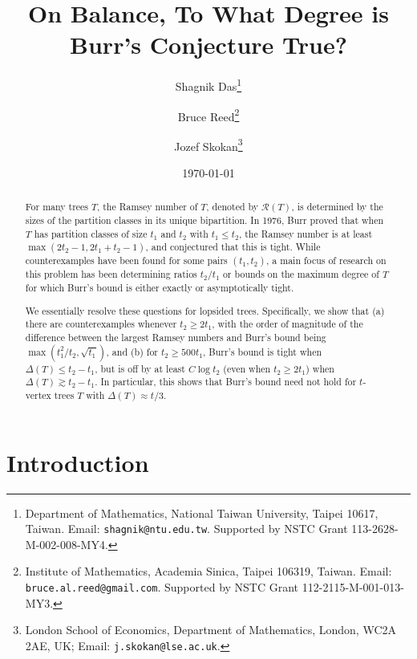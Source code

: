 \documentclass[11pt]{article}
\begin{document}
\title{On Balance, To What Degree is Burr's Conjecture True?} 
\author{Shagnik Das\footnote{Department of Mathematics, National Taiwan University, Taipei 10617, Taiwan. Email: \texttt{shagnik@ntu.edu.tw}. Supported by NSTC Grant 113-2628-M-002-008-MY4.} 
\and 
Bruce Reed\footnote{Institute of Mathematics, Academia Sinica, Taipei 106319, Taiwan. Email: \texttt{bruce.al.reed@gmail.com}. Supported by NSTC Grant 112-2115-M-001-013-MY3.} 
\and 
Jozef Skokan\footnote{London School of Economics, Department of Mathematics, London, WC2A 2AE, UK; Email: \texttt{j.skokan@lse.ac.uk}.} }
\date{\today}



\maketitle
\begin{abstract}
    For many trees $T$, the Ramsey number of $T$, denoted by ${\mathcal R}(T)$, is determined by the sizes of the partition classes in its unique bipartition. In 1976, Burr proved that when $T$ has partition classes of size $t_1$ and $t_2$ with $t_1 \le t_2$, the Ramsey number is at least $\max(2t_2-1,2t_1+t_2-1)$, and conjectured that this is tight. While counterexamples have been found for some pairs $(t_1, t_2)$, a main focus of research on this problem has been determining ratios $t_2/t_1$ or bounds on the maximum degree of $T$ for which Burr's bound is either exactly or asymptotically tight.
    
    We essentially resolve these questions for lopsided trees. Specifically, we show that (a) there are counterexamples whenever $t_2 \ge 2t_1$, with the order of magnitude of the difference between the largest Ramsey numbers and Burr's bound being $\max \left( t_1^2/t_2, \sqrt{t_1} \right)$, and (b) for $t_2 \ge 500 t_1$, Burr's bound is tight when $\Delta(T) \le t_2 - t_1$, but is off by at least $C \log t_2$ (even when $t_2 \ge 2 t_1$) when $\Delta(T) \gtrsim t_2 - t_1$. In particular, this shows that Burr's bound need not hold for $t$-vertex trees $T$ with $\Delta(T) \approx t/3$.
\end{abstract}

\thispagestyle{empty}
\section{Introduction }
\end{document}
